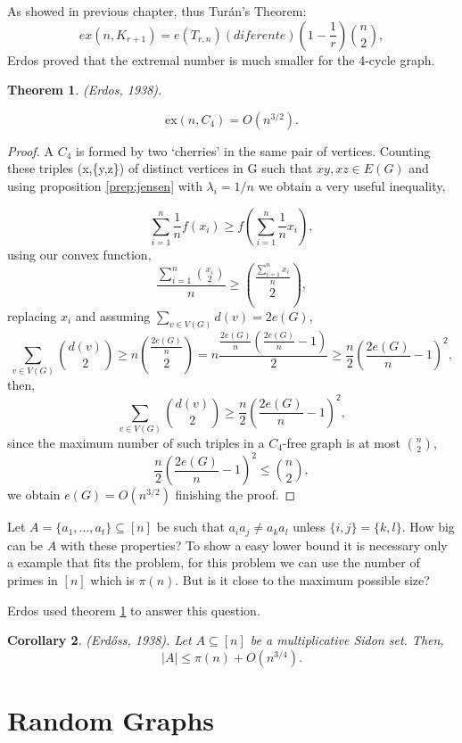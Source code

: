 \documentclass[12pt,twoside,a4paper]{book}
\numberwithin{equation}{section}
\let\subset\subseteq
\newtheorem{theorem}             {Theorem}[section]
\newtheorem{corollary}	[theorem] {Corollary}
\theoremstyle{remark}
\begin{document}
As showed in previous chapter, thus Turán's Theorem:
$$ ex(n,K_{r+1}) = e(T_{r,n}) (diferente) \left( 1-\frac{1}{r}\right) \binom{n}{2} ,$$
Erdos proved that the extremal number is much smaller for the 4-cycle graph.
 
\begin{theorem} \label{theorem: Erdos,1938}
(Erdos, 1938).

$$\text{ex}(n,C_4) = O(n^{3/2}).$$
\end{theorem}

\begin{proof}
A $C_4$ is formed by two `cherries' in the same pair of vertices. Counting these triples (x,\{y,z\}) of distinct vertices in G such that $xy, xz \in E(G)$ and using proposition \ref{prep:jensen} with $\lambda_i = 1/n$ we obtain a very useful inequality,

$$ \sum_{i=1}^n \frac{1}{n} f\left(x_i\right) \geq f\left(\sum_{i=1}^n \frac{1}{n} x_i\right),$$
using our convex function,
$$ \frac{\sum_{i=1}^n \binom{x_i}{2}}{n} \geq \binom{\frac{\sum_{i=1}^n x_i}{n}}{2} ,$$
replacing $x_i$ and assuming $\sum_{v \in V(G)} d(v) = 2e(G),$
$$ \sum_{v \in V(G)} \binom{d(v)}{2} \geq n \binom{\frac{2e(G)}{n}}{2}= n\frac{\frac{2e(G)}{n}\left( \frac{2e(G)}{n}-1\right)}{2} \geq \frac{n}{2} \left( \frac{2e(G)}{n} - 1 \right)^2,$$
then,
$$\sum_{v \in V(G)} \binom{d(v)}{2} \geq \frac{n}{2} \left( \frac{2e(G)}{n} - 1 \right)^2,$$
since the maximum number of such triples in a $C_4$-free graph is at most $\binom{n}{2}$,
$$ \frac{n}{2}\left(\frac{2e(G)}{n} - 1\right)^2 \leq \binom{n}{2},$$
we obtain $e(G) = O(n^{3/2})$ finishing the proof.
\end{proof}

Let $A = \{a_1,...,a_t\} \subset [n]$ be such that $a_ia_j \neq a_ka_l$ unless $\{i,j\} = \{k,l\}$. How big can be $A$ with these properties?
To show a easy lower bound it is necessary only a example that fits the problem, for this problem we can use the number of primes in $[n]$ which is $\pi (n)$. But is it close to the maximum possible size?

Erdos used theorem \ref{theorem: Erdos,1938} to answer this question.

\begin{corollary}(Erd\H{o}ss, 1938). Let $A\subseteq [n]$ be a multiplicative Sidon set. Then,
$$ |A| \leq \pi(n) + O(n^{3/4}). $$

\end{corollary}

\chapter{Random Graphs}
\end{document}

